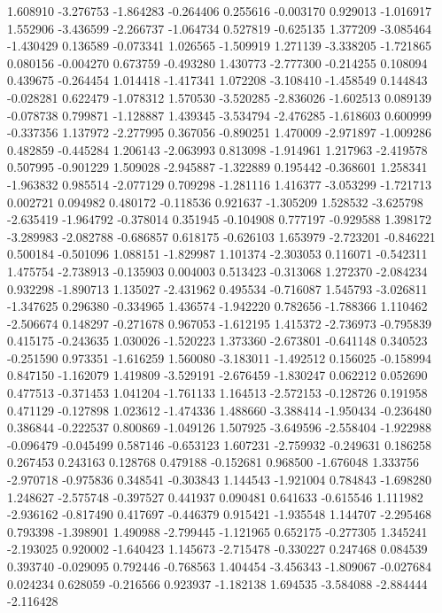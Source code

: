 1.608910
-3.276753
-1.864283
-0.264406
0.255616
-0.003170
0.929013
-1.016917
1.552906
-3.436599
-2.266737
-1.064734
0.527819
-0.625135
1.377209
-3.085464
-1.430429
0.136589
-0.073341
1.026565
-1.509919
1.271139
-3.338205
-1.721865
0.080156
-0.004270
0.673759
-0.493280
1.430773
-2.777300
-0.214255
0.108094
0.439675
-0.264454
1.014418
-1.417341
1.072208
-3.108410
-1.458549
0.144843
-0.028281
0.622479
-1.078312
1.570530
-3.520285
-2.836026
-1.602513
0.089139
-0.078738
0.799871
-1.128887
1.439345
-3.534794
-2.476285
-1.618603
0.600999
-0.337356
1.137972
-2.277995
0.367056
-0.890251
1.470009
-2.971897
-1.009286
0.482859
-0.445284
1.206143
-2.063993
0.813098
-1.914961
1.217963
-2.419578
0.507995
-0.901229
1.509028
-2.945887
-1.322889
0.195442
-0.368601
1.258341
-1.963832
0.985514
-2.077129
0.709298
-1.281116
1.416377
-3.053299
-1.721713
0.002721
0.094982
0.480172
-0.118536
0.921637
-1.305209
1.528532
-3.625798
-2.635419
-1.964792
-0.378014
0.351945
-0.104908
0.777197
-0.929588
1.398172
-3.289983
-2.082788
-0.686857
0.618175
-0.626103
1.653979
-2.723201
-0.846221
0.500184
-0.501096
1.088151
-1.829987
1.101374
-2.303053
0.116071
-0.542311
1.475754
-2.738913
-0.135903
0.004003
0.513423
-0.313068
1.272370
-2.084234
0.932298
-1.890713
1.135027
-2.431962
0.495534
-0.716087
1.545793
-3.026811
-1.347625
0.296380
-0.334965
1.436574
-1.942220
0.782656
-1.788366
1.110462
-2.506674
0.148297
-0.271678
0.967053
-1.612195
1.415372
-2.736973
-0.795839
0.415175
-0.243635
1.030026
-1.520223
1.373360
-2.673801
-0.641148
0.340523
-0.251590
0.973351
-1.616259
1.560080
-3.183011
-1.492512
0.156025
-0.158994
0.847150
-1.162079
1.419809
-3.529191
-2.676459
-1.830247
0.062212
0.052690
0.477513
-0.371453
1.041204
-1.761133
1.164513
-2.572153
-0.128726
0.191958
0.471129
-0.127898
1.023612
-1.474336
1.488660
-3.388414
-1.950434
-0.236480
0.386844
-0.222537
0.800869
-1.049126
1.507925
-3.649596
-2.558404
-1.922988
-0.096479
-0.045499
0.587146
-0.653123
1.607231
-2.759932
-0.249631
0.186258
0.267453
0.243163
0.128768
0.479188
-0.152681
0.968500
-1.676048
1.333756
-2.970718
-0.975836
0.348541
-0.303843
1.144543
-1.921004
0.784843
-1.698280
1.248627
-2.575748
-0.397527
0.441937
0.090481
0.641633
-0.615546
1.111982
-2.936162
-0.817490
0.417697
-0.446379
0.915421
-1.935548
1.144707
-2.295468
0.793398
-1.398901
1.490988
-2.799445
-1.121965
0.652175
-0.277305
1.345241
-2.193025
0.920002
-1.640423
1.145673
-2.715478
-0.330227
0.247468
0.084539
0.393740
-0.029095
0.792446
-0.768563
1.404454
-3.456343
-1.809067
-0.027684
0.024234
0.628059
-0.216566
0.923937
-1.182138
1.694535
-3.584088
-2.884444
-2.116428
